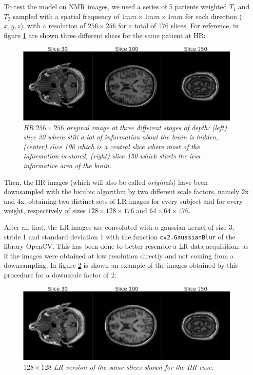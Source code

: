 \documentclass[12pt,a4paper]{report}
\begin{document}
To test the model on NMR images, we used a series of 5 patients weighted $T_1$ and $T_2$ sampled with a spatial frequency of $1mm \times 1mm \times 1mm$ for each direction ($x, y, z$), with a resolution of $256 \times 256$ for a total of 176 slices. For reference, in figure \ref{fig:orig_ref} are shown three different slices for the same patient at HR:

\begin{figure}[H]
 \centering
 \includegraphics[scale=0.31]{./images/orig_slice_comp.png}
 \caption{\it HR $256 \times 256$ original image at three different stages of depth: (left) slice 30 where still a lot of information about the brain is hidden, (center) slice 100 which is a central slice where most of the information is stored, (right) slice 150 which starts the less informative area of the brain.}
 \label{fig:orig_ref}
\end{figure}

Then, the HR images (which will also be called {\it originals}) have been  downsampled with the bicubic algorithm by two different scale factors, namely 2x and 4x, obtaining two distinct sets of LR images for every subject and for every weight, respectively of sizes $128 \times 128 \times 176$ and $64 \times 64 \times 176$.

After all that, the LR images are convoluted with a gaussian kernel of size 3, stride 1 and standard deviation 1 with the function \texttt{cv2.GaussianBlur} of the library OpenCV. 
This has been done to better resemble a LR data-acquisition, as if the images were obtained at low resolution directly and not coming from a downsampling.
In figure \ref{fig:inp2} is shown an example of the images obtained by this procedure for a downscale factor of 2:

\begin{figure}[H]
 \centering
 \includegraphics[scale=0.3]{images/inp2_slice_comp.png}
 \caption{\it $128 \times 128$ LR version of the same slices shown for the HR case.}
 \label{fig:inp2}
\end{figure}
\end{document}
